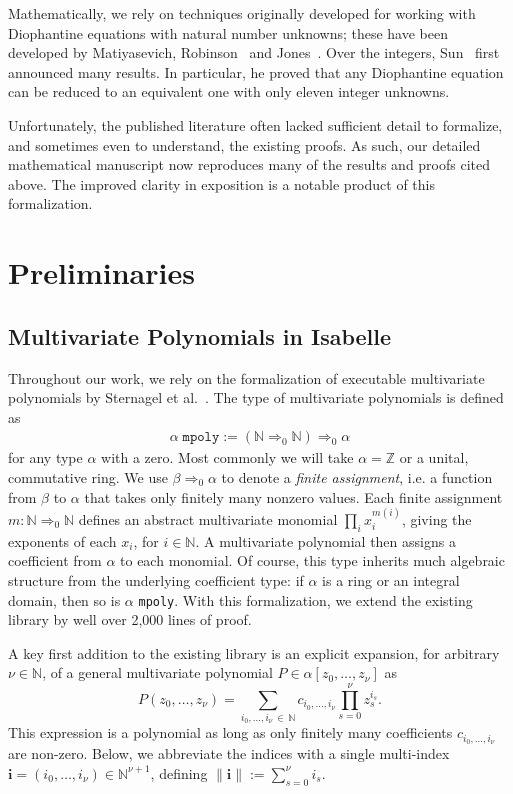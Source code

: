 \documentclass[a4paper,USenglish,cleveref,autoref,thm-restate]{lipics-v2021}
\newcommand{\N}{{\mathbb N}}
\newcommand{\Z}{{\mathbb Z}}
\begin{document}
Mathematically, we rely on techniques originally developed for working with Diophantine equations with natural number unknowns; these have been developed by Matiyasevich, Robinson~\cite{MR75} and Jones~\cite{9var}. Over the integers, Sun~\cite{Sun}
first announced many results. In particular, he proved that any Diophantine equation can be reduced to an equivalent one with only eleven integer unknowns. 

Unfortunately, the published literature often lacked sufficient detail to formalize, and sometimes even to understand, the existing proofs. As such, our detailed mathematical manuscript now reproduces many of the results and proofs cited above. The improved clarity in exposition is a notable product of this formalization. 

\section{Preliminaries}

\subsection{Multivariate Polynomials in Isabelle}
Throughout our work, we rely on the formalization of executable multivariate polynomials by Sternagel et al.~\cite{polynomials-afp}. The type of multivariate polynomials is defined as
\begin{align}\label{eq:typedef-mpoly}
    \alpha\; \texttt{mpoly} := (\N \Rightarrow_0 \N) \Rightarrow_0 \alpha
\end{align}
for any type $\alpha$ with a zero. Most commonly we will take $\alpha = \Z$ or a unital, commutative ring. We use $\beta \Rightarrow_0 \alpha$ to denote a \emph{finite assignment}, i.e. a function from $\beta$ to $\alpha$ that takes only finitely many nonzero values. Each finite assignment $m : \N \Rightarrow_0 \N$ defines an abstract multivariate monomial $\prod_i x_i^{m(i)}$, giving the exponents of each $x_i$, for $i\in \N$. A multivariate polynomial then assigns a coefficient from $\alpha$ to each monomial. Of course, this type inherits much algebraic structure from the underlying coefficient type: if $\alpha$ is a ring or an integral domain, then so is $\alpha$ \texttt{mpoly}. With this formalization, we extend the existing library by well over 2,000 lines of proof.

A key first addition to the existing library is an explicit expansion, for arbitrary $\nu \in \N$, of a general multivariate polynomial $P \in \alpha[z_0, \ldots, z_\nu]$ as
\begin{equation}\label{eq:multivariate-expansion}
    P(z_0, \ldots, z_\nu) = \sum_{i_0, \ldots, i_\nu \, \in \, \N} c_{i_0, \ldots, i_\nu} \prod_{s=0}^\nu z_s^{i_s}.
\end{equation}
This expression is a polynomial as long as only finitely many coefficients $c_{i_0, \ldots, i_\nu}$ are non-zero. Below, we abbreviate the indices with a single multi-index $\mathbf{i} = (i_0, \ldots, i_\nu) \in \N^{\nu+1}$, defining $\|\mathbf{i}\| := \sum_{s=0}^\nu i_s$.
\end{document}
